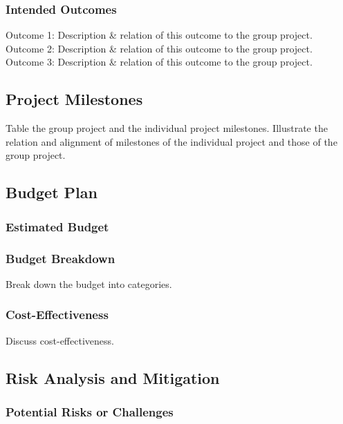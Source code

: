 \documentclass[12pt, a4paper]{article}
\begin{document}
\subsubsection{Intended Outcomes}

Outcome 1: Description \& relation of this outcome to the group project. \\
Outcome 2: Description \& relation of this outcome to the group project. \\
Outcome 3: Description \& relation of this outcome to the group project. \\

\subsection{Project Milestones}

Table the group project and the individual project milestones. Illustrate the relation
and alignment of milestones of the individual project and those of the group project.

\subsection{Budget Plan}

\subsubsection{Estimated Budget}

\subsubsection{Budget Breakdown}

Break down the budget into categories.

\subsubsection{Cost-Effectiveness}

Discuss cost-effectiveness.

\subsection{Risk Analysis and Mitigation}

\subsubsection{Potential Risks or Challenges}
\end{document}
